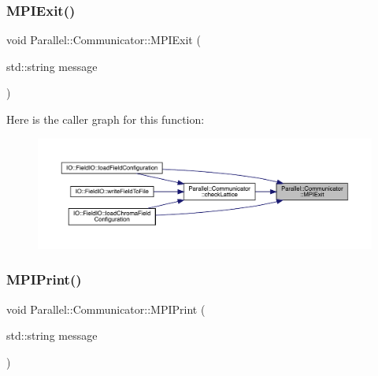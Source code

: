 \subsubsection{\texorpdfstring{MPIExit()}{MPIExit()}}
{\footnotesize\ttfamily void Parallel\+::\+Communicator\+::\+M\+P\+I\+Exit (\begin{DoxyParamCaption}\item[{std\+::string}]{message }\end{DoxyParamCaption})\hspace{0.3cm}{\ttfamily [static]}}

Here is the caller graph for this function\+:\nopagebreak
\begin{figure}[H]
\begin{center}
\leavevmode
\includegraphics[width=350pt]{class_parallel_1_1_communicator_a6759125172843d9229c644f2a3a21ab7_icgraph}
\end{center}
\end{figure}
\mbox{\label{class_parallel_1_1_communicator_ab1b15401de819cf343398b767d6730ed}} 
\subsubsection{\texorpdfstring{MPIPrint()}{MPIPrint()}}
{\footnotesize\ttfamily void Parallel\+::\+Communicator\+::\+M\+P\+I\+Print (\begin{DoxyParamCaption}\item[{std\+::string}]{message }\end{DoxyParamCaption})\hspace{0.3cm}{\ttfamily [static]}}

\mbox{\label{class_parallel_1_1_communicator_a3da13427d693e0ce924159e871c83e19}} 
